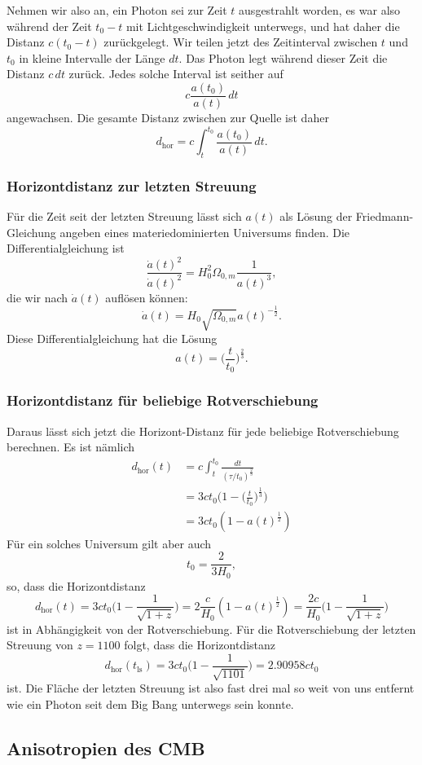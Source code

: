 Nehmen wir also an, ein Photon sei zur Zeit $t$ ausgestrahlt worden,
es war also während der Zeit $t_0-t$ mit Lichtgeschwindigkeit unterwegs,
und hat daher die Distanz $c(t_0-t)$ zurückgelegt.
Wir teilen jetzt des Zeitinterval zwischen $t$ und $t_0$ in kleine
Intervalle der Länge $dt$.
Das Photon legt während dieser Zeit die Distanz $c\,dt$ zurück.
Jedes solche Interval ist seither auf
\[
c \frac{a(t_0)}{a(t)}\,dt
\]
angewachsen.
Die gesamte Distanz zwischen zur Quelle ist daher
\[
d_\text{hor} = c \int_t^{t_0} \frac{a(t_0)}{a(t)}\,dt.
\]

\subsubsection{Horizontdistanz zur letzten Streuung}
Für die Zeit seit der letzten Streuung lässt sich $a(t)$ als
Lösung der Friedmann-Gleichung angeben eines materiedominierten
Universums finden.
Die Differentialgleichung ist
\[
\frac{\dot a(t)^2}{\dot a(t)^2}
=
H_0^2\Omega_{0,m}\frac1{a(t)^3},
\]
die wir nach $\dot a(t)$ auflösen können:
\[
\dot a(t)
=
H_0\sqrt{\Omega_{0,m}} a(t)^{-\frac12}.
\]
Diese Differentialgleichung hat die Lösung
\[
a(t) = \biggl(\frac{t}{t_0}\biggr)^\frac23.
\]
\subsubsection{Horizontdistanz für beliebige Rotverschiebung}
Daraus lässt sich jetzt die Horizont-Distanz für jede beliebige 
Rotverschiebung berechnen.
Es ist nämlich
\begin{align*}
d_{\text{hor}}(t)
&=
c\int_t^{t_0} \frac{dt}{(\tau/t_0)^\frac23}
\\
&=
3ct_0\biggl(1-\biggl(\frac{t}{t_0}\biggr)^\frac13\biggr)
\\
&=
3ct_0(1-a(t)^\frac12)
\end{align*}
Für ein solches Universum gilt aber auch 
\[
t_0=\frac{2}{3H_0},
\]
so, dass die Horizontdistanz
\[
d_{\text{hor}}(t)
=
3ct_0\biggl(1-\frac1{\sqrt{1+z}}\biggr)
=
2\frac{c}{H_0}(1-a(t)^\frac12)
=
\frac{2c}{H_0}\biggl(1-\frac{1}{\sqrt{1+z}}\biggr)
\]
ist in Abhängigkeit von der Rotverschiebung.
Für die Rotverschiebung der letzten Streuung von $z=1100$ folgt, dass
die Horizontdistanz
\[
d_{\text{hor}}(t_{\text{ls}})
=
3ct_0 \biggl(1-\frac{1}{\sqrt{1101}}\biggr)
=
2.90958 ct_0
\]
ist.
Die Fläche der letzten Streuung ist also fast drei mal so weit von uns
entfernt wie ein Photon seit dem Big Bang unterwegs sein konnte.


\subsection{Anisotropien des CMB}








